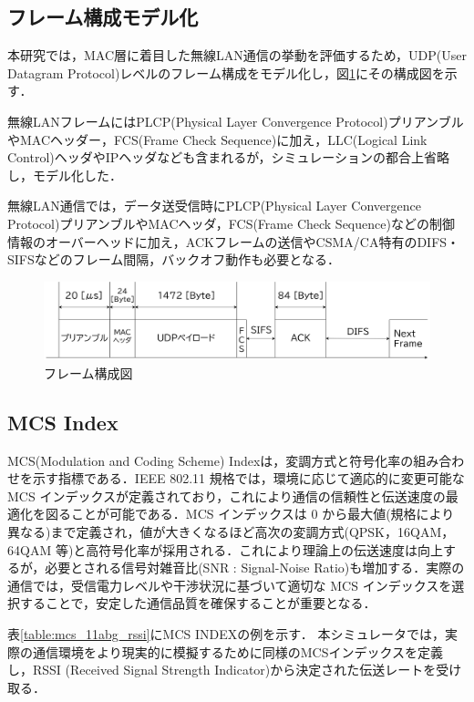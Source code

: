 \documentclass[a4paper,10pt]{ltjsarticle}
\begin{document}
\subsection{フレーム構成モデル化}

本研究では，MAC層に着目した無線LAN通信の挙動を評価するため，UDP(User Datagram Protocol)レベルのフレーム構成をモデル化し，図\ref{packet}にその構成図を示す．

無線LANフレームにはPLCP(Physical Layer Convergence Protocol)プリアンブルやMACヘッダー，FCS(Frame Check Sequence)に加え，LLC(Logical Link Control)ヘッダやIPヘッダなども含まれるが，シミュレーションの都合上省略し，モデル化した．

無線LAN通信では，データ送受信時にPLCP(Physical Layer Convergence Protocol)プリアンブルやMACヘッダ，FCS(Frame Check Sequence)などの制御情報のオーバーヘッドに加え，ACKフレームの送信やCSMA/CA特有のDIFS・SIFSなどのフレーム間隔，バックオフ動作も必要となる．

\begin{figure}[H]
  \centering
  \includegraphics[width=1\columnwidth]{./assets/packet.png}
  \caption{フレーム構成図}
  \label{packet}
\end{figure}

\clearpage

\subsection{MCS Index}
MCS(Modulation and Coding Scheme) Indexは，変調方式と符号化率の組み合わせを示す指標である．IEEE 802.11 規格では，環境に応じて適応的に変更可能な MCS インデックスが定義されており，これにより通信の信頼性と伝送速度の最適化を図ることが可能である．MCS インデックスは 0 から最大値(規格により異なる)まで定義され，値が大きくなるほど高次の変調方式(QPSK，16QAM，64QAM 等)と高符号化率が採用される．これにより理論上の伝送速度は向上するが，必要とされる信号対雑音比(SNR : Signal-Noise Ratio)も増加する．実際の通信では，受信電力レベルや干渉状況に基づいて適切な MCS インデックスを選択することで，安定した通信品質を確保することが重要となる．

表\ref{table:mcs_11abg_rssi}にMCS INDEXの例を示す．
本シミュレータでは，実際の通信環境をより現実的に模擬するために同様のMCSインデックスを定義し，RSSI (Received Signal Strength Indicator)から決定された伝送レートを受け取る．\\
\end{document}
